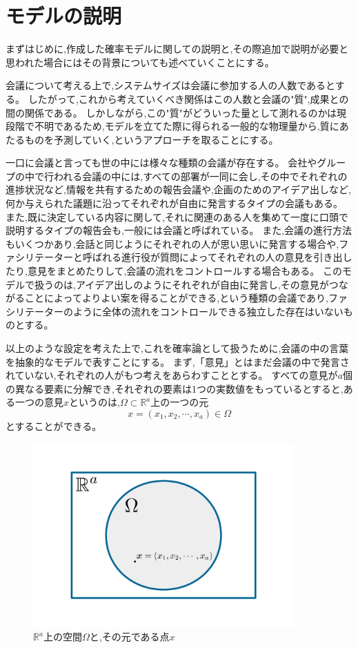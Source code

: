 \chapter{モデルの説明}

まずはじめに,作成した確率モデルに関しての説明と,その際追加で説明が必要と思われた場合にはその背景についても述べていくことにする。


会議について考える上で,システムサイズは会議に参加する人の人数であるとする。
したがって,これから考えていくべき関係はこの人数と会議の"質",成果との間の関係である。
しかしながら,この"質"がどういった量として測れるのかは現段階で不明であるため,モデルを立てた際に得られる一般的な物理量から,質にあたるものを予測していく,というアプローチを取ることにする。


一口に会議と言っても世の中には様々な種類の会議が存在する。
会社やグループの中で行われる会議の中には,すべての部署が一同に会し,その中でそれぞれの進捗状況など,情報を共有するための報告会議や,企画のためのアイデア出しなど,何か与えられた議題に沿ってそれぞれが自由に発言するタイプの会議もある。
また,既に決定している内容に関して,それに関連のある人を集めて一度に口頭で説明するタイプの報告会も,一般には会議と呼ばれている。
また,会議の進行方法もいくつかあり,会話と同じようにそれぞれの人が思い思いに発言する場合や,ファシリテーターと呼ばれる進行役が質問によってそれぞれの人の意見を引き出したり,意見をまとめたりして,会議の流れをコントロールする場合もある。
このモデルで扱うのは,アイデア出しのようにそれぞれが自由に発言し,その意見がつながることによってよりよい案を得ることができる,という種類の会議であり,ファシリテーターのように全体の流れをコントロールできる独立した存在はいないものとする。


以上のような設定を考えた上で,これを確率論として扱うために,会議の中の言葉を抽象的なモデルで表すことにする。
まず,「意見」とはまだ会議の中で発言されていない,それぞれの人がもつ考えをあらわすこととする。
すべての意見が$a$個の異なる要素に分解でき,それぞれの要素は1つの実数値をもっているとすると,ある一つの意見$x$というのは,$\Omega \subset \mathbb{R}^{a}$上の一つの元
\[x = (x_{1}, x_{2}, \cdots ,x_{a}) \in \Omega\]
とすることができる。

\begin{figure}[H]
    \begin{center}
        \includegraphics[width=10cm]{../img/ideaspace.jpg}
        \caption{$\mathbb{R}^{a}$上の空間$\Omega$と,その元である点$x$}
        \label{fig:f1}
    \end{center}
\end{figure}

